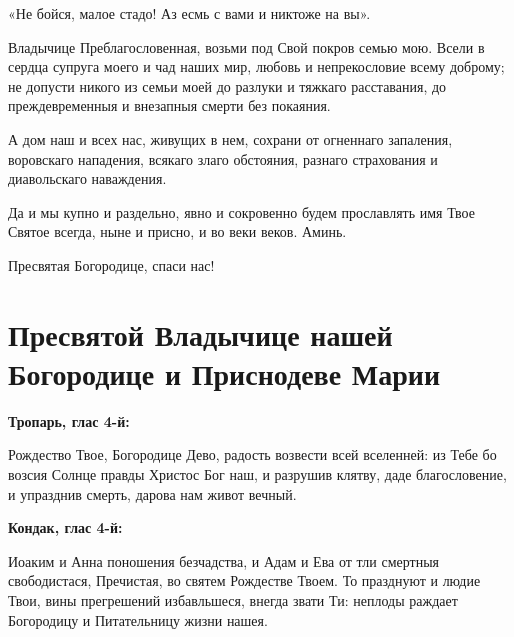 «Не бойся, малое стадо! Аз есмь с вами и никтоже на вы».


Владычице Преблагословенная, возьми под Свой покров семью мою. Всели в сердца супруга моего и чад наших мир, любовь и непрекословие всему доброму;  не допусти никого из семьи моей до разлуки и тяжкаго расставания, до преждевременныя и внезапныя смерти без покаяния.

А дом наш и всех нас, живущих в нем, сохрани от огненнаго запаления, воровскаго нападения, всякаго злаго обстояния, разнаго страхования и диавольскаго наваждения.

Да и мы купно и раздельно, явно и сокровенно будем прославлять имя Твое Святое всегда, ныне и присно, и во веки веков. Аминь.


Пресвятая Богородице, спаси нас!


\bigskip\bigskip\mychapterending


 

{\noparindent\begin{minipage}{\textwidth}
\section{Пресвятой Владычице нашей Богородице и Приснодеве Марии}
\restoreparindent
\bfseries Тропарь, глас 4-й:\normalfont{}


Рождество Твое, Богородице Дево, радость возвести всей вселенней: из Тебе бо возсия Солнце правды Христос Бог наш, и разрушив клятву, даде благословение, и упразднив смерть, дарова нам живот вечный.


\medskip


\bfseries Кондак, глас 4-й:\normalfont{}


Иоаким и Анна поношения безчадства, и Адам и Ева от тли смертныя свободистася, Пречистая, во святем Рождестве Твоем. То празднуют и людие Твои, вины прегрешений избавльшеся, внегда звати Ти: неплоды раждает Богородицу и Питательницу жизни нашея.

\end{minipage}}

